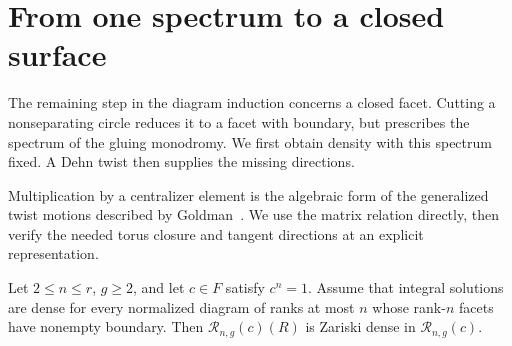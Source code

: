 \section{From one spectrum to a closed surface}
\label{sec:dynamics}

The remaining step in the diagram induction concerns a closed facet.
Cutting a nonseparating circle reduces it to a facet with boundary, but
prescribes the spectrum of the gluing monodromy.  We first obtain density
with this spectrum fixed.  A Dehn twist then supplies the missing
directions.

Multiplication by a centralizer element is the algebraic form of
the generalized twist motions described by
Goldman~\cite[Section~4.6]{Goldman1986}.  We use the matrix relation
directly, then verify the needed torus closure and tangent directions
at an explicit representation.

\begin{lemma}\label{lem:closed-density}
Let $2\le n\le r$, $g\ge2$, and let $c\in F$ satisfy $c^n=1$.
Assume that integral solutions are dense for every normalized diagram
of ranks at most $n$ whose rank-$n$ facets have nonempty boundary.
Then $\mathcal R_{n,g}(c)(R)$ is Zariski dense in
$\mathcal R_{n,g}(c)$.
\end{lemma}


